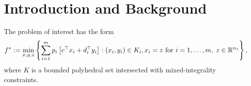 \section{Introduction and Background}
The problem of interest has the form
\begin{equation}\label{P1}
f^*:=\min_{x,y,z} \left\{ \sum_{i=1}^m p_i \left[ c^\top x_i + d_i^\top y_i \right] : (x_i,y_i) \in K_i,  x_i=z \text{ for }i=1,\dots,m,\; z \in \mathbb{R}^{n_1} \right \},
\end{equation}
where $K$ is a bounded polyhedral set intersected with mixed-integrality constraints. 

